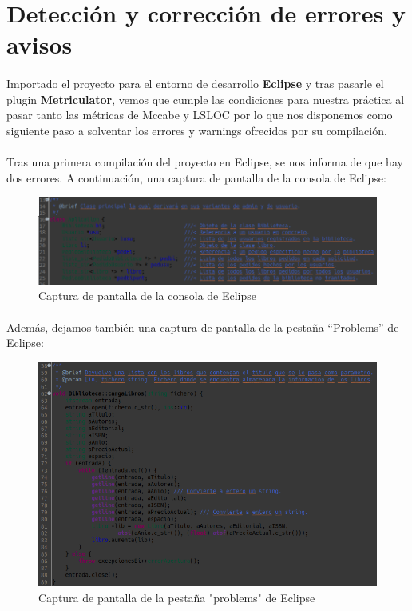 \section{Detección y corrección de errores y avisos}

\paragraph{}Importado el proyecto para el entorno de desarrollo \textbf{Eclipse} y tras pasarle el plugin \textbf{Metriculator}, vemos que cumple las condiciones para nuestra práctica al pasar tanto las métricas de Mccabe y LSLOC por lo que nos disponemos como siguiente paso a solventar los errores y warnings ofrecidos por su compilación.

\paragraph{}Tras una primera compilación del proyecto en Eclipse, se nos informa de que hay dos errores. A continuación, una captura de pantalla de la consola de Eclipse:

\begin{figure}[H]
	\centering
	\includegraphics[scale=0.3]{img/captura2.png}
	\caption{Captura de pantalla de la consola de Eclipse}
	\label{captura1}
\end{figure}

\paragraph{}Además, dejamos también una captura de pantalla de la pestaña “Problems” de Eclipse:

\begin{figure}[H]
	\centering
	\includegraphics[scale=0.3]{img/captura1.png}
	\caption{Captura de pantalla de la pestaña "problems" de Eclipse}
	\label{captura2}
\end{figure}


